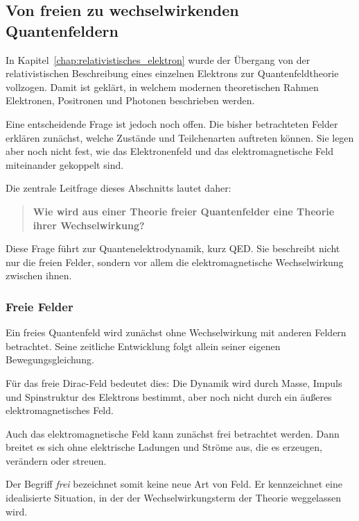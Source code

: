 \subsection{Von freien zu wechselwirkenden Quantenfeldern}
\label{subsec:freie_wechselwirkende_quantenfelder}

In Kapitel~\ref{chap:relativistisches_elektron} wurde der Übergang von der
relativistischen Beschreibung eines einzelnen Elektrons zur
Quantenfeldtheorie vollzogen.
Damit ist geklärt, in welchem modernen theoretischen Rahmen Elektronen,
Positronen und Photonen beschrieben werden.

Eine entscheidende Frage ist jedoch noch offen.
Die bisher betrachteten Felder erklären zunächst, welche Zustände und
Teilchenarten auftreten können.
Sie legen aber noch nicht fest, wie das Elektronenfeld und das
elektromagnetische Feld miteinander gekoppelt sind.

Die zentrale Leitfrage dieses Abschnitts lautet daher:

\begin{quote}
	\textbf{Wie wird aus einer Theorie freier Quantenfelder eine Theorie
	ihrer Wechselwirkung?}
\end{quote}

Diese Frage führt zur Quantenelektrodynamik,
kurz QED\@.
Sie beschreibt nicht nur die freien Felder, sondern vor allem die
elektromagnetische Wechselwirkung zwischen ihnen.

\subsubsection*{Freie Felder}

Ein freies Quantenfeld wird zunächst ohne
Wechselwirkung mit anderen Feldern betrachtet.
Seine zeitliche Entwicklung folgt allein seiner eigenen
Bewegungsgleichung.

Für das freie Dirac-Feld bedeutet dies:
Die Dynamik wird durch Masse, Impuls und Spinstruktur des Elektrons
bestimmt, aber noch nicht durch ein äußeres elektromagnetisches Feld.

Auch das elektromagnetische Feld kann zunächst frei betrachtet werden.
Dann breitet es sich ohne elektrische Ladungen und Ströme aus, die es
erzeugen, verändern oder streuen.

Der Begriff \emph{frei} bezeichnet somit keine neue Art von Feld.
Er kennzeichnet eine idealisierte Situation, in der der
Wechselwirkungsterm der Theorie weggelassen
wird.


